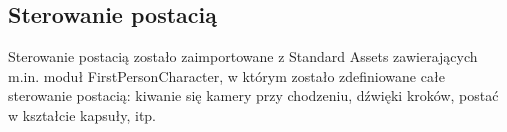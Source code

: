 \subsection{Sterowanie postacią}
Sterowanie postacią zostało zaimportowane z Standard Assets zawierających m.in. moduł FirstPersonCharacter, w którym zostało zdefiniowane całe sterowanie postacią: kiwanie się kamery przy chodzeniu, dźwięki kroków, postać w kształcie kapsuły, itp.